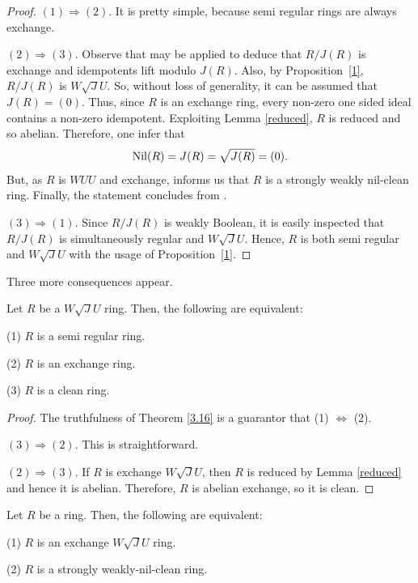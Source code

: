 \documentclass[12pt]{amsart}
\begin{document}
\begin{proof} \((1) \Rightarrow (2)\). It is pretty simple, because semi regular rings are always exchange.

\((2) \Rightarrow (3)\). Observe that \cite[Corollary 2.4]{8} may be applied to deduce that \(R/J(R)\) is exchange and idempotents lift modulo \(J(R)\). Also, by Proposition~\ref {1}, \(R/J(R)\) is $W\sqrt{J}U$. So, without loss of generality, it can be assumed that \(J(R) = (0)\). Thus, since \(R\) is an exchange ring, every non-zero one sided ideal contains a non-zero idempotent. Exploiting Lemma \ref{reduced}, \(R\) is reduced and so abelian. Therefore, one infer that \[ {\rm Nil}(R) = J(R) = \sqrt{J(R)} = (0) .\] But, as \(R\) is $WUU$ and exchange, \cite[Corollary 2.15]{wuu} informs us that $R$ is a strongly weakly nil-clean ring. Finally, the statement concludes from \cite[Theorem 3.2]{ch}.
	
\((3) \Rightarrow (1)\). Since $R/J(R)$ is weakly Boolean, it is easily inspected that $R/J(R)$ is simultaneously regular and $W\sqrt{J}U$. Hence, $R$ is both semi regular and $W\sqrt{J}U$ with the usage of Proposition~\ref{1}.
\end{proof}

Three more consequences appear.

\begin{corollary}\label{3.17} Let \( R \) be a $W\sqrt{J}U$ ring. Then, the following are equivalent:

(1) \( R \) is a semi regular ring.

(2) \( R \) is an exchange ring.

(3) \( R \) is a clean ring.
\end{corollary}

\begin{proof} The truthfulness of Theorem \ref{3.16} is a guarantor that (1) \(\Leftrightarrow\) (2). 	

\((3) \Rightarrow (2)\). This is straightforward. 	

\((2) \Rightarrow (3)\). If \( R \) is exchange $W\sqrt{J}U$, then \( R \) is reduced by Lemma \ref{reduced} and hence it is abelian. Therefore, \( R \) is abelian exchange, so it is clean.
\end{proof}

\begin{corollary}\label{3.18} Let \( R \) be a ring. Then, the following are equivalent:

(1) \( R \) is an exchange $W\sqrt{J}U$ ring.

(2) \( R \) is a strongly weakly-nil-clean ring.
\end{corollary}
\end{document}
